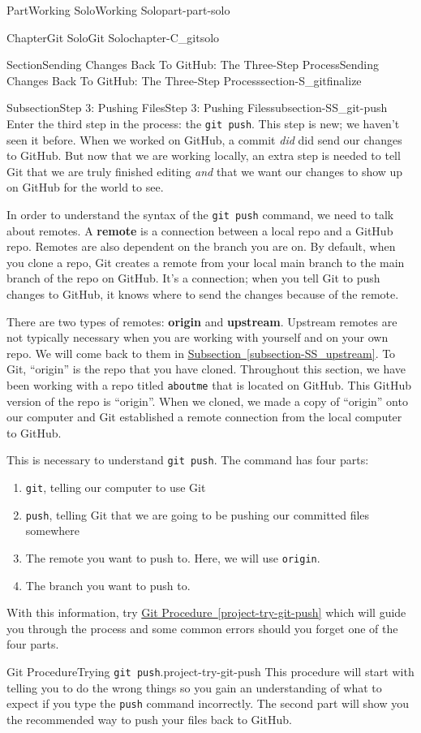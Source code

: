 \documentclass[oneside,10pt,]{book}
\newcommand{\xreffont}{\relax}
\newcommand{\mono}[1]{\texttt{#1}}
\newcommand{\terminology}[1]{\textbf{#1}}
\begin{document}
\begin{partptx}{Part}{Working Solo}{}{Working Solo}{}{}{part-part-solo}
\begin{chapterptx}{Chapter}{Git Solo}{}{Git Solo}{}{}{chapter-C_gitsolo}
\begin{sectionptx}{Section}{Sending Changes Back To GitHub: The Three-Step Process}{}{Sending Changes Back To GitHub: The Three-Step Process}{}{}{section-S_gitfinalize}
\begin{subsectionptx}{Subsection}{Step 3: Pushing Files}{}{Step 3: Pushing Files}{}{}{subsection-SS_git-push}
Enter the third step in the process: the \mono{git push}. This step is new; we haven't seen it before. When we worked on GitHub, a commit \emph{did} did send our changes to GitHub. But now that we are working locally, an extra step is needed to tell Git that we are truly finished editing \emph{and} that we want our changes to show up on GitHub for the world to see.%
\par
In order to understand the syntax of the \mono{git push} command, we need to talk about remotes. A \terminology{remote} is a connection between a local repo and a GitHub repo. Remotes are also dependent on the branch you are on. By default, when you clone a repo, Git creates a remote from your local main branch to the main branch of the repo on GitHub. It's a connection; when you tell Git to push changes to GitHub, it knows where to send the changes because of the remote.%
\par
There are two types of remotes: \terminology{origin} and \terminology{upstream}. Upstream remotes are not typically necessary when you are working with yourself and on your own repo. We will come back to them in \hyperref[subsection-SS_upstream]{Subsection~{\xreffont\ref{subsection-SS_upstream}}}. To Git, ``origin'' is the repo that you have cloned. Throughout this section, we have been working with a repo titled \mono{aboutme} that is located on GitHub. This GitHub version of the repo is ``origin''. When we cloned, we made a copy of ``origin'' onto our computer and Git established a remote connection from the local computer to GitHub.%
\par
This is necessary to understand \mono{git push}. The command has four parts:%
\begin{enumerate}
\item{}\mono{git}, telling our computer to use Git%
\item{}\mono{push}, telling Git that we are going to be pushing our committed files somewhere%
\item{}The remote you want to push to. Here, we will use \mono{origin}.%
\item{}The branch you want to push to.%
\end{enumerate}
With this information, try \hyperref[project-try-git-push]{Git Procedure~{\xreffont\ref{project-try-git-push}}} which will guide you through the process and some common errors should you forget one of the four parts.%
\begin{project}{Git Procedure}{Trying \mono{git push}.}{project-try-git-push}%
This procedure will start with telling you to do the wrong things so you gain an understanding of what to expect if you type the \mono{push} command incorrectly. The second part will show you the recommended way to push your files back to GitHub.%

\end{project}
\end{subsectionptx}
\end{sectionptx}
\end{chapterptx}
\end{partptx}
\end{document}
